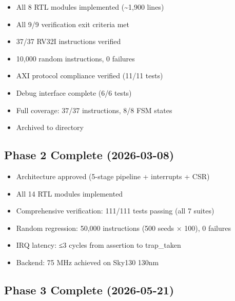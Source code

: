 \begin{record}

\begin{itemize}
\tightlist
\item
  \ok{} All 8 RTL modules implemented (\textasciitilde1,900 lines)
\item
  \ok{} All 9/9 verification exit criteria met
\item
  \ok{} 37/37 RV32I instructions verified
\item
  \ok{} 10,000 random instructions, 0 failures
\item
  \ok{} AXI protocol compliance verified (11/11 tests)
\item
  \ok{} Debug interface complete (6/6 tests)
\item
  \ok{} Full coverage: 37/37 instructions, 8/8 FSM states
\item
  \ok{} Archived to  directory
\end{itemize}

\end{record}

\subsection{\texorpdfstring{Phase 2 Complete \ok{}
(2026-03-08)}{Phase 2 Complete  (2026-03-08)}}\label{cr:status:phase-history:phase-2-complete-white-check-mark-2026-03-08}

\begin{record}

\begin{itemize}
\tightlist
\item
  \ok{} Architecture approved (5-stage pipeline + interrupts + CSR)
\item
  \ok{} All 14 RTL modules implemented
\item
  \ok{} Comprehensive verification: 111/111 tests passing (all 7 suites)
\item
  \ok{} Random regression: 50,000 instructions (500 seeds × 100), 0
  failures
\item
  \ok{} IRQ latency: ≤3 cycles from assertion to
  trap\_\allowbreak{}taken
\item
  \ok{} Backend: 75 MHz achieved on Sky130 130nm
\end{itemize}

\end{record}

\subsection{\texorpdfstring{Phase 3 Complete \ok{}
(2026-05-21)}{Phase 3 Complete  (2026-05-21)}}\label{cr:status:phase-history:phase-3-complete-white-check-mark-2026-05-21}

